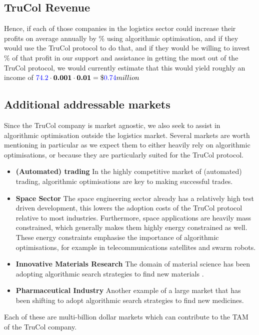 

\subsection{TruCol Revenue}
Hence, if each of those companies in the logistics sector could increase their profits on average annually by \textbf{\avgalgooptimisationprofitpercentage}\% using algorithmic optimisation, and if they would use the TruCol protocol to do that, and if they would be willing to invest \textbf{\TruColcutonprofitpercentage}\% of that profit in our support and assistance in getting the most out of the TruCol protocol, we would currently estimate that this would yield roughly an income of $\textcolor{blue}{74.2}\cdot \textbf{0.001}\cdot \textbf{0.01}=\$\textcolor{blue}{0.74} million$

\subsection{Additional addressable markets}\label{subsubsec:additional_markets}
Since the TruCol company is market agnostic, we also seek to assist in algorithmic optimisation outside the logistics market. Several markets are worth mentioning in particular as we expect them to either heavily rely on algorithmic optimisations, or because they are particularly suited for the TruCol protocol.
\begin{itemize}
	\item \textbf{(Automated) trading} In the highly competitive market of (automated) trading, algorithmic optimisations are key to making successful trades.
	\item \textbf{Space Sector} The space engineering sector already has a relatively high test driven development, this lowers the adoption costs of the TruCol protocol relative to most industries. Furthermore, space applications are heavily mass constrained, which generally makes them highly energy constrained as well. These energy constraints emphasise the importance of algorithmic optimisations, for example in telecommunications satellites and swarm robots.
	\item \textbf{Innovative Materials Research} The domain of material science has been adopting algorithmic search strategies to find new materials  \cite{allahyari2020coevolutionary}.
	\item \textbf{Pharmaceutical Industry} Another example of a large market that has been shifting to adopt algorithmic search strategies to find new medicines.
\end{itemize}
Each of these are multi-billion dollar markets which can contribute to the TAM of the TruCol company.
